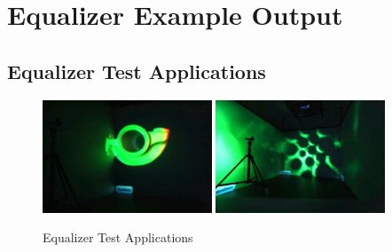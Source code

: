 \chapter{Equalizer Example Output}


\section{Equalizer Test Applications}
\label{sec:eqSample}
\begin{figure}[H]
	\centering
	\includegraphics[width=0.45\textwidth]{../figures/fotos/demo_eqPly}
	\includegraphics[width=0.45\textwidth]{../figures/fotos/demo_eVolve}
	\caption{Equalizer Test Applications}
\end{figure}
